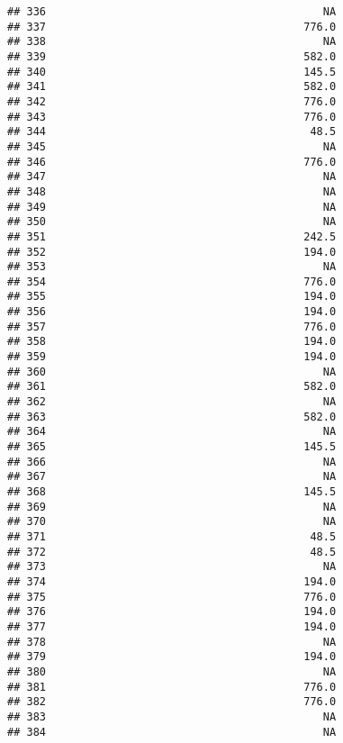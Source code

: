 \documentclass[
]{article}
\begin{document}
\begin{verbatim}
## 336                                           NA
## 337                                        776.0
## 338                                           NA
## 339                                        582.0
## 340                                        145.5
## 341                                        582.0
## 342                                        776.0
## 343                                        776.0
## 344                                         48.5
## 345                                           NA
## 346                                        776.0
## 347                                           NA
## 348                                           NA
## 349                                           NA
## 350                                           NA
## 351                                        242.5
## 352                                        194.0
## 353                                           NA
## 354                                        776.0
## 355                                        194.0
## 356                                        194.0
## 357                                        776.0
## 358                                        194.0
## 359                                        194.0
## 360                                           NA
## 361                                        582.0
## 362                                           NA
## 363                                        582.0
## 364                                           NA
## 365                                        145.5
## 366                                           NA
## 367                                           NA
## 368                                        145.5
## 369                                           NA
## 370                                           NA
## 371                                         48.5
## 372                                         48.5
## 373                                           NA
## 374                                        194.0
## 375                                        776.0
## 376                                        194.0
## 377                                        194.0
## 378                                           NA
## 379                                        194.0
## 380                                           NA
## 381                                        776.0
## 382                                        776.0
## 383                                           NA
## 384                                           NA
\end{verbatim}
\end{document}
